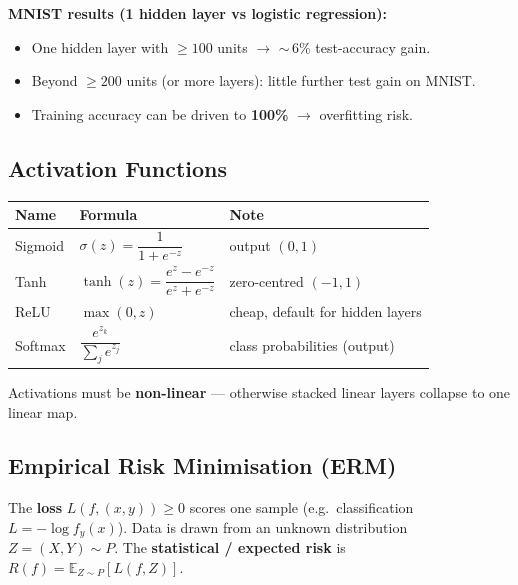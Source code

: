 \documentclass[10pt,a4paper]{article}
\begin{document}
	\begin{importantbox}
		\textbf{MNIST results (1 hidden layer vs logistic regression):}
		\begin{itemize}[leftmargin=*]
			\item One hidden layer with $\ge 100$ units $\rightarrow$ $\sim$\,6\% test-accuracy gain.
			\item Beyond $\ge 200$ units (or more layers): little further test gain on MNIST.
			\item Training accuracy can be driven to \textbf{100\%} $\rightarrow$ overfitting risk.
		\end{itemize}
	\end{importantbox}

	\subsection{Activation Functions}

	\begin{center}
		\begin{tabular}{lll}
			\toprule
			Name & Formula & Note \\
			\midrule
			Sigmoid & $\sigma(z)=\dfrac{1}{1+e^{-z}}$ & output $(0,1)$ \\
			Tanh    & $\tanh(z)=\dfrac{e^z-e^{-z}}{e^z+e^{-z}}$ & zero-centred $(-1,1)$ \\
			ReLU    & $\max(0,z)$ & cheap, default for hidden layers \\
			Softmax & $\dfrac{e^{z_k}}{\sum_j e^{z_j}}$ & class probabilities (output) \\
			\bottomrule
		\end{tabular}
	\end{center}
	\noindent\footnotesize Activations must be \textbf{non-linear} --- otherwise stacked linear layers collapse to one linear map.\normalsize

	\subsection{Empirical Risk Minimisation (ERM)}

	\begin{definitionbox}
		The \textbf{loss} $L(f,(x,y))\ge 0$ scores one sample (e.g.\ classification $L=-\log f_y(x)$). Data is drawn from an unknown distribution $Z=(X,Y)\sim P$. The \textbf{statistical / expected risk} is $R(f)=\mathbb{E}_{Z\sim P}[L(f,Z)]$.
	\end{definitionbox}
\end{document}
